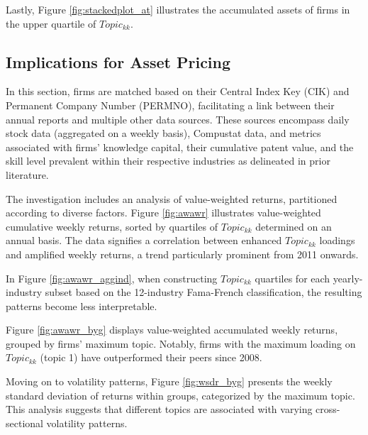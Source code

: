 \documentclass[12pt, letterpaper]{article}
\begin{document}
Lastly, Figure \ref{fig:stackedplot_at} illustrates the accumulated assets of firms in the upper quartile of $Topic_{kk}$.


\subsection{Implications for Asset Pricing}

In this section, firms are matched based on their Central Index Key (CIK) and Permanent Company Number (PERMNO), facilitating a link between their annual reports and multiple other data sources. These sources encompass daily stock data (aggregated on a weekly basis), Compustat data, and metrics associated with firms' knowledge capital, their cumulative patent value, and the skill level prevalent within their respective industries as delineated in prior literature.

The investigation includes an analysis of value-weighted returns, partitioned according to diverse factors. Figure \ref{fig:awawr} illustrates value-weighted cumulative weekly returns, sorted by quartiles of $Topic_{kk}$ determined on an annual basis. The data signifies a correlation between enhanced $Topic_{kk}$ loadings and amplified weekly returns, a trend particularly prominent from 2011 onwards.


In Figure \ref{fig:awawr_aggind}, when constructing $Topic_{kk}$ quartiles for each yearly-industry subset based on the 12-industry Fama-French classification, the resulting patterns become less interpretable.


Figure \ref{fig:awawr_byg} displays value-weighted accumulated weekly returns, grouped by firms' maximum topic. Notably, firms with the maximum loading on $Topic_{kk}$ (topic 1) have outperformed their peers since 2008.


Moving on to volatility patterns, Figure \ref{fig:wsdr_byg} presents the weekly standard deviation of returns within groups, categorized by the maximum topic. This analysis suggests that different topics are associated with varying cross-sectional volatility patterns.
\end{document}
